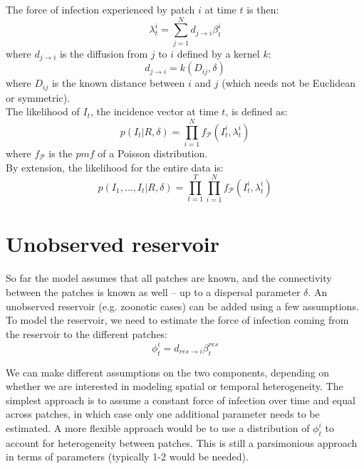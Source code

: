 \documentclass[a4paper,11pt]{article}
\begin{document}
The force of infection experienced by patch $i$ at time $t$ is then:
\begin{equation}
\lambda_t^i =  \sum_{j=1}^N d_{j\rightarrow i} \beta_t^i
\end{equation}
where $d_{j\rightarrow i}$ is the diffusion from $j$ to $i$ defined by a kernel 
$k$:
\begin{equation}
d_{j\rightarrow i} = k(D_{ij}, \delta)
\end{equation}
where $D_{ij}$ is the known distance between $i$ and $j$ (which needs not be 
Euclidean or symmetric).
\\

The likelihood of $I_t$, the incidence vector at time $t$, is defined as:
\begin{equation}
p(I_t | R, \delta) = \prod_{i=1}^N f_\mathcal{P}(I_t^i, \lambda_t^i)
\end{equation}
where $f_\mathcal{P}$ is the $pmf$ of a Poisson distribution.
\\

By extension, the likelihood for the entire data is:
\begin{equation}
p(I_1, \ldots, I_t | R, \delta) = \prod_{t=1}^T \prod_{i=1}^N f_\mathcal{P}(I_t^i, \lambda_t^i)
\end{equation}




\section{Unobserved reservoir}

So far the model assumes that all patches are known, and the connectivity 
between the patches is known as well -- up to a dispersal parameter $\delta$.
An unobserved reservoir (e.g. zoonotic cases) can be added using a few 
assumptions. 
To model the reservoir, we need to estimate the force of infection coming from 
the reservoir to the different patches:
\begin{equation}
\phi_t^i = d_{res \rightarrow i} \beta_t^{res}
\end{equation}

We can make different assumptions on the two components, depending on whether 
we are interested in modeling spatial or temporal heterogeneity.
The simplest approach is to assume a constant 
force of infection over time and equal across patches, in which case only one 
additional parameter needs to be estimated.
A more flexible approach would be to use a distribution of $\phi_t^i$ to 
account for heterogeneity between patches.
This is still a parsimonious approach in terms of parameters (typically 1-2 
would be needed).
\end{document}
